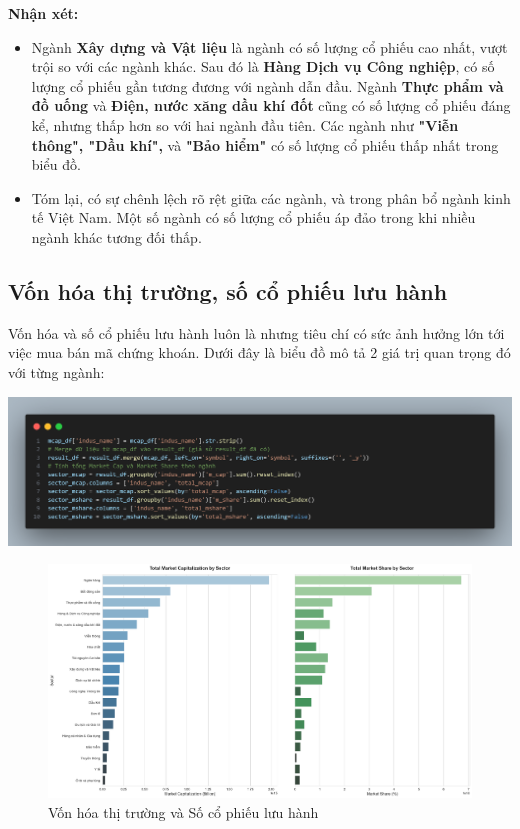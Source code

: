 \textbf{Nhận xét:}
\begin{itemize}
    \item Ngành \textbf{Xây dựng và Vật liệu} là ngành có số lượng cổ phiếu cao nhất, vượt trội so với các ngành khác. Sau đó là \textbf{Hàng Dịch vụ Công nghiệp}, có số lượng cổ phiếu gần tương đương với ngành dẫn đầu. Ngành \textbf{Thực phẩm và đồ uống} và \textbf{Điện, nước xăng dầu khí đốt} cũng có số lượng cổ phiếu đáng kể, nhưng thấp hơn so với hai ngành đầu tiên. Các ngành như \textbf{"Viễn thông", "Dầu khí",} và \textbf{"Bảo hiểm"} có số lượng cổ phiếu thấp nhất trong biểu đồ.
    \item Tóm lại, có sự chênh lệch rõ rệt giữa các ngành, và trong phân bổ ngành kinh tế Việt Nam. Một số ngành có số lượng cổ phiếu áp đảo trong khi nhiều ngành khác tương đối thấp.
\end{itemize}

\subsection{Vốn hóa thị trường, số cổ phiếu lưu hành}
Vốn hóa và số cổ phiếu lưu hành luôn là nhưng tiêu chí có sức ảnh hưởng lớn tới việc mua bán mã chứng khoán. Dưới đây là biểu đồ mô tả 2 giá trị quan trọng đó với từng ngành:

\begin{center}
    \includegraphics[width=1\linewidth]{images/code-3.19.png}
\end{center}

\begin{figure}[H]
    \centering
    \includegraphics[width=1\linewidth]{images/plot-3.9-column_chart_merged.png}
    \caption{Vốn hóa thị trường và Số cổ phiếu lưu hành}
    \label{fig:3.2}
\end{figure}

